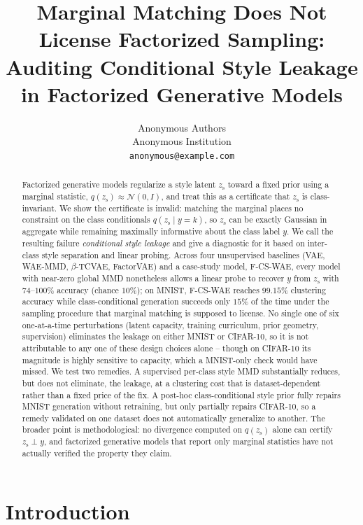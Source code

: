 \documentclass[10pt,letterpaper]{article}
\title{\vspace{-1.0em}
Marginal Matching Does Not License Factorized Sampling: \\
Auditing Conditional Style Leakage in Factorized Generative Models
\vspace{-0.3em}}
\author{
Anonymous Authors\\
\small Anonymous Institution\\
\small \texttt{anonymous@example.com}
}
\date{}
\newcommand{\ours}{F-CS-WAE}
\newcommand{\zs}{z_{\mathrm{s}}}
\begin{document}
\maketitle

\begin{abstract}
Factorized generative models regularize a style latent $\zs$ toward a fixed
prior using a marginal statistic, $q(\zs)\approx\mathcal N(0,I)$, and treat
this as a certificate that $\zs$ is class-invariant. We show the certificate
is invalid: matching the marginal places no constraint on the class
conditionals $q(\zs\mid y{=}k)$, so $\zs$ can be exactly Gaussian in
aggregate while remaining maximally informative about the class label $y$.
We call the resulting failure \emph{conditional style leakage} and give a
diagnostic for it based on inter-class style separation and linear probing.
Across four unsupervised baselines (VAE, WAE-MMD, $\beta$-TCVAE,
FactorVAE) and a case-study model, \ours{}, every model with near-zero
global MMD nonetheless allows a linear probe to recover $y$ from $\zs$ with
$74$--$100\%$ accuracy (chance $10\%$); on MNIST, \ours{} reaches $99.15\%$
clustering accuracy while class-conditional generation succeeds only $15\%$
of the time under the sampling procedure that marginal matching is supposed
to license. No single one of six one-at-a-time perturbations (latent
capacity, training curriculum, prior geometry, supervision) eliminates the
leakage on either MNIST or CIFAR-10, so it is not attributable to any one
of these design choices alone -- though on CIFAR-10 its magnitude is highly
sensitive to capacity, which a MNIST-only check would have missed. We test
two remedies. A supervised per-class style MMD
substantially reduces, but does not eliminate, the leakage, at a clustering
cost that is dataset-dependent rather than a fixed price of the fix. A
post-hoc class-conditional style prior fully repairs MNIST generation
without retraining, but only partially repairs CIFAR-10, so a remedy
validated on one dataset does not automatically generalize to another. The
broader point is methodological: no divergence computed on $q(\zs)$ alone
can certify $\zs\perp y$, and factorized generative models that report only
marginal statistics have not actually verified the property they claim.
\end{abstract}

\section{Introduction}
\label{sec:intro}
\end{document}
